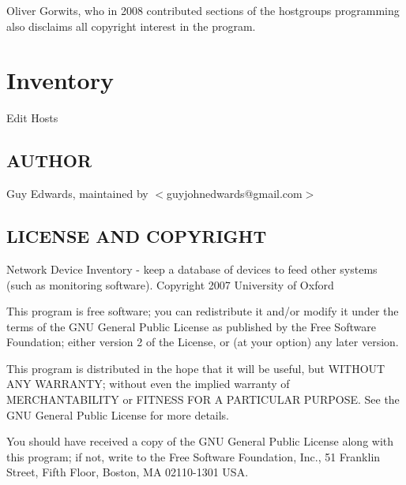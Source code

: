 \documentclass{book}
\begin{document}
Oliver Gorwits, who in 2008 contributed sections of the hostgroups programming also disclaims all copyright interest in the program.




\section{Inventory}
\label{_Inventory::Edithosts}
\hypertarget{_Inventory::Edithosts}{}



Edit Hosts


\subsection{AUTHOR}
\label{Inventory::Edithosts_AUTHOR}
\hypertarget{Inventory::Edithosts_AUTHOR}{}



Guy Edwards, maintained by $<$guyjohnedwards@gmail.com$>$


\subsection{LICENSE AND COPYRIGHT}
\label{Inventory::Edithosts_LICENSE_AND_COPYRIGHT}
\hypertarget{Inventory::Edithosts_LICENSE_AND_COPYRIGHT}{}



Network Device Inventory - keep a database of devices to feed other systems (such as monitoring software). Copyright 2007 University of Oxford



This program is free software; you can redistribute it and/or modify it under the terms of the GNU General Public License as published by the Free Software Foundation; either version 2 of the License, or (at your option) any later version.



This program is distributed in the hope that it will be useful, but WITHOUT ANY WARRANTY; without even the implied warranty of MERCHANTABILITY or FITNESS FOR A PARTICULAR PURPOSE. See the GNU General Public License for more details.



You should have received a copy of the GNU General Public License along with this program; if not, write to the Free Software Foundation, Inc., 51 Franklin Street, Fifth Floor, Boston, MA 02110-1301 USA.
\end{document}
